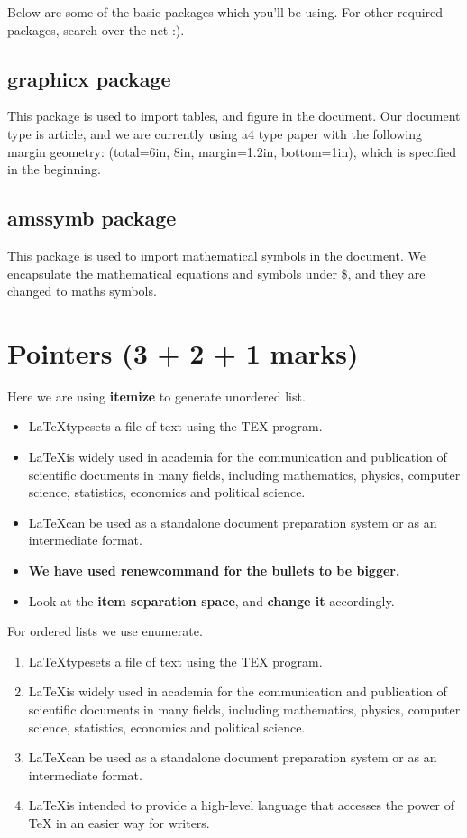 \documentclass[12pt]{article}
\newcommand{\LATEX}{\LaTeX}
\begin{document}
Below are some of the basic packages which you’ll be using. For other
required packages, search over the net :).
\par


\subsection {graphicx package}
This package is used to import tables, and figure in the document. Our
document type is article, and we are currently using a4 type paper with the
following margin geometry: (total={6in, 8in}, margin=1.2in, bottom=1in),
which is specified in the beginning.

\subsection {amssymb package}
This package is used to import mathematical symbols in the document. We
encapsulate the mathematical equations and symbols under \$, and they are
changed to maths symbols.
 
\section{Pointers (3 + 2 + 1 marks)}
Here we are using \textbf{itemize} to generate unordered list.
\begin{itemize}
 
 \setlength\itemsep{1em}
	\item \LATEX typesets a file of text using the TEX program.
	\item \LATEX is widely used in academia for the communication and publication of scientific documents in many fields, including mathematics, physics, computer science, statistics, economics and political science.
	\item \LATEX can be used as a standalone document preparation system or as an intermediate format.
	\item \textbf{We have used renewcommand for the bullets to be bigger.}
	\item Look at the \textbf{item separation space}, and \textbf{change it} accordingly.
\end{itemize}

For ordered lists we use enumerate.

\begin{enumerate}[label=\Roman*]
\item \LATEX typesets a file of text using the TEX program.
\item \LATEX is widely used in academia for the communication and publication
of scientific documents in many fields, including mathematics, physics,
computer science, statistics, economics and political science.
\item \LaTeX can be used as a standalone document preparation system or as an
intermediate format.
\item \LATEX is intended to provide a high-level language that accesses the power
of TeX in an easier way for writers.

\end{enumerate}
\end{document}
